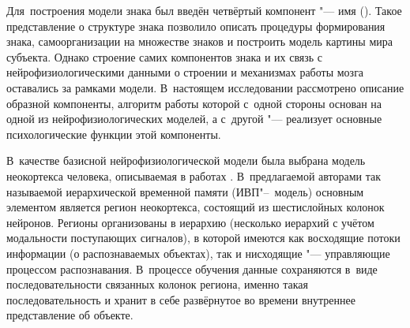 \documentclass[a4paper, 12pt]{article}
\theoremstyle{plain}
\begin{document}
	Для~построения модели знака был введён четвёртый компонент "--- имя (\cite{Pospelov2002, PanovA2014a}). Такое представление о структуре знака позволило описать процедуры формирования знака, самоорганизации на множестве знаков и построить модель картины мира субъекта. Однако строение самих компонентов знака и их связь с нейрофизиологическими данными о строении и механизмах работы мозга оставались за рамками модели. В~настоящем исследовании рассмотрено описание образной компоненты, алгоритм работы которой с~одной стороны основан на одной из нейрофизиологических моделей, а с~другой "--- реализует основные психологические функции этой компоненты.
	
	В~качестве базисной нейрофизиологической модели была выбрана модель неокортекса человека, описываемая в работах \cite{Hawkins2009,George20051812}. В~предлагаемой авторами так называемой иерархической временной памяти (ИВП"--~модель) основным элементом является регион неокортекса, состоящий из шестислойных колонок нейронов. Регионы организованы в иерархию (несколько иерархий с учётом модальности поступающих сигналов), в которой имеются как восходящие потоки информации (о распознаваемых объектах), так и нисходящие "--- управляющие процессом распознавания. В~процессе обучения данные сохраняются в~виде последовательности связанных колонок региона, именно такая последовательность и хранит в себе развёрнутое во времени внутреннее представление об объекте.
	
\end{document}

